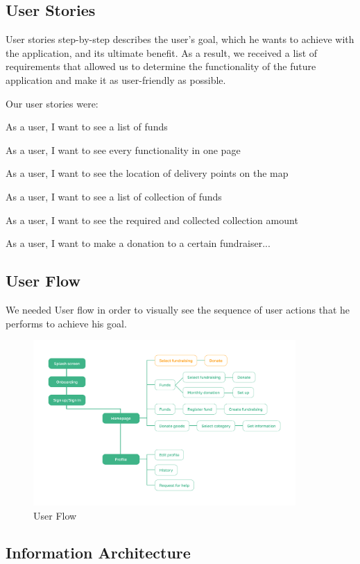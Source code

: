 \subsection{User Stories}
    
User stories step-by-step describes the user's goal, which he wants to achieve with the
application, and its ultimate benefit. As a result, we received a list of requirements that allowed us to determine the functionality of the future application and make it as user-friendly as possible.

Our user stories were:

As a user, I want to see a list of funds

As a user, I want to see every functionality in one page

As a user, I want to see the location of delivery points on the map

As a user, I want to see a list of collection of funds

As a user, I want to see the required and collected collection amount

As a user, I want to make a donation to a certain fundraiser...

\subsection{User Flow}

We needed User flow in order to visually see the sequence of user actions that he performs to achieve his goal.

\begin{figure}[h]
    \centering
    \includegraphics[width=10cm]{figures/userInterface/user flow.jpg}
    \caption{User Flow}
    \label{fig:userFlow}
\end{figure}

\subsection{Information Architecture}

